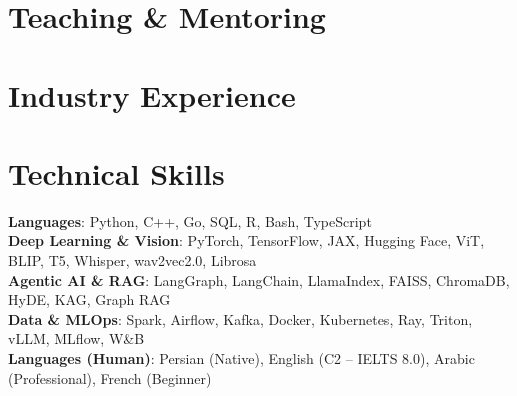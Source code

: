 \documentclass[letterpaper,11pt]{article}
\newenvironment{resumeSubHeadingList}{\begin{itemize}[leftmargin=0.15in, label={}]}{\end{itemize}}
\begin{document}
\section{Teaching \& Mentoring}
\begin{resumeSubHeadingList}
  
\end{resumeSubHeadingList}

\section{Industry Experience}
\begin{resumeSubHeadingList}
  
\end{resumeSubHeadingList}

\section{Technical Skills}
\begin{itemize}[leftmargin=0.15in, label={}]
  \small{\item{
    \textbf{Languages}{: Python, C++, Go, SQL, R, Bash, TypeScript} \\
    \textbf{Deep Learning \& Vision}{: PyTorch, TensorFlow, JAX, Hugging Face, ViT, BLIP, T5, Whisper, wav2vec2.0, Librosa} \\
    \textbf{Agentic AI \& RAG}{: LangGraph, LangChain, LlamaIndex, FAISS, ChromaDB, HyDE, KAG, Graph RAG} \\
    \textbf{Data \& MLOps}{: Spark, Airflow, Kafka, Docker, Kubernetes, Ray, Triton, vLLM, MLflow, W\&B} \\
    \textbf{Languages (Human)}{: Persian (Native), English (C2 -- IELTS 8.0), Arabic (Professional), French (Beginner)}
  }}
\end{itemize}
\end{document}
